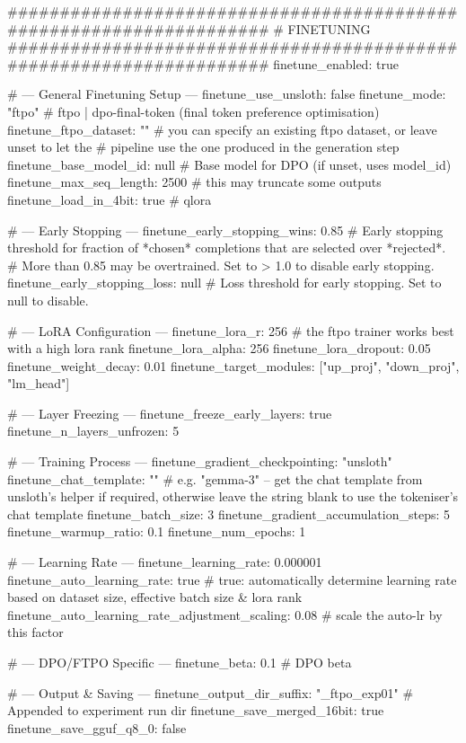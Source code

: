 \documentclass[11pt]{article}
\begin{document}
\begin{cfgblock}
####################################################################
# FINETUNING
####################################################################
finetune_enabled: true

# --- General Finetuning Setup ---
finetune_use_unsloth: false
finetune_mode: "ftpo" # ftpo | dpo-final-token (final token preference optimisation)
finetune_ftpo_dataset: ""   # you can specify an existing ftpo dataset, or leave unset to let the
                            # pipeline use the one produced in the generation step
finetune_base_model_id: null # Base model for DPO (if unset, uses model_id)
finetune_max_seq_length: 2500 # this may truncate some outputs
finetune_load_in_4bit: true # qlora

# --- Early Stopping ---
finetune_early_stopping_wins: 0.85  # Early stopping threshold for fraction of *chosen* completions that are selected over *rejected*.
                                    # More than 0.85 may be overtrained. Set to > 1.0 to disable early stopping.
finetune_early_stopping_loss: null  # Loss threshold for early stopping. Set to null to disable.

# --- LoRA Configuration ---
finetune_lora_r: 256 # the ftpo trainer works best with a high lora rank
finetune_lora_alpha: 256
finetune_lora_dropout: 0.05
finetune_weight_decay: 0.01
finetune_target_modules: ["up_proj", "down_proj", "lm_head"]

# --- Layer Freezing ---
finetune_freeze_early_layers: true
finetune_n_layers_unfrozen: 5

# --- Training Process ---
finetune_gradient_checkpointing: "unsloth"
finetune_chat_template: "" # e.g. "gemma-3" -- get the chat template from unsloth's helper if required, otherwise leave the string blank to use the tokeniser's chat template
finetune_batch_size: 3
finetune_gradient_accumulation_steps: 5
finetune_warmup_ratio: 0.1
finetune_num_epochs: 1

# --- Learning Rate ---
finetune_learning_rate: 0.000001
finetune_auto_learning_rate: true  # true: automatically determine learning rate based on dataset size, effective batch size & lora rank
finetune_auto_learning_rate_adjustment_scaling: 0.08 # scale the auto-lr by this factor

# --- DPO/FTPO Specific ---
finetune_beta: 0.1 # DPO beta

# --- Output & Saving ---
finetune_output_dir_suffix: "_ftpo_exp01" # Appended to experiment run dir
finetune_save_merged_16bit: true
finetune_save_gguf_q8_0: false


\end{cfgblock}
\end{document}
